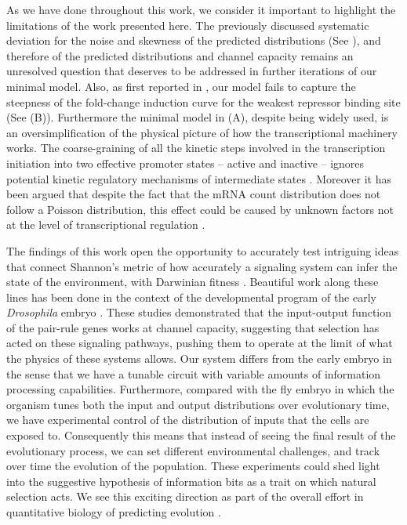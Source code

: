 As we have done throughout this work, we consider it important to highlight the
limitations of the work presented here. The previously discussed systematic
deviation for the noise and skewness of the predicted distributions (See
), and therefore of the predicted distributions and
channel capacity remains an unresolved question that deserves to be addressed
in further iterations of our minimal model. Also, as first reported in
\cite{Razo-Mejia2018}, our model fails to capture the steepness of the
fold-change induction curve for the weakest repressor binding site (See
(B)). Furthermore the minimal model in
(A), despite being widely used, is an
oversimplification of the physical picture of how the transcriptional machinery
works. The coarse-graining of all the kinetic steps involved in the
transcription initiation into two effective promoter states -- active and
inactive -- ignores potential kinetic regulatory mechanisms of intermediate
states \cite{Scholes2017}. Moreover it has been argued that despite the fact
that the mRNA count distribution does not follow a Poisson distribution, this
effect could be caused by unknown factors not at the level of transcriptional
regulation \cite{Choubey2018}.

The findings of this work open the opportunity to accurately test intriguing
ideas that connect Shannon's metric of how accurately a signaling system can
infer the state of the environment, with Darwinian fitness \cite{Taylor2007}.
Beautiful work along these lines has been done in the context of the
developmental program of the early {\it Drosophila} embryo \cite{Tkacik2008,
Petkova2019}. These studies demonstrated that the input-output function of the
pair-rule genes works at channel capacity, suggesting that selection has acted
on these signaling pathways, pushing them to operate at the limit of what the
physics of these systems allows. Our system differs from the early embryo in
the sense that we have a tunable circuit with variable amounts of information
processing capabilities. Furthermore, compared with the fly embryo in which the
organism tunes both the input and output distributions over evolutionary time,
we have experimental control of the distribution of inputs that the cells are
exposed to. Consequently this means that instead of seeing the final result of
the evolutionary process, we can set different environmental challenges, and
track over time the evolution of the population. These experiments could shed
light into the suggestive hypothesis of information bits as a trait on which
natural selection acts. We see this exciting direction as part of the overall
effort in quantitative biology of predicting evolution \cite{Lassig2017}.